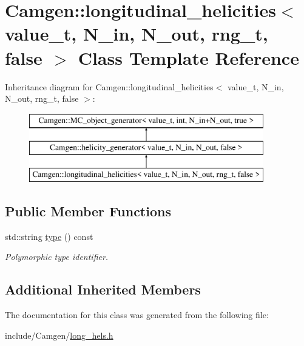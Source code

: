 \hypertarget{a00328}{\section{Camgen\-:\-:longitudinal\-\_\-helicities$<$ value\-\_\-t, N\-\_\-in, N\-\_\-out, rng\-\_\-t, false $>$ Class Template Reference}
\label{a00328}
}
Inheritance diagram for Camgen\-:\-:longitudinal\-\_\-helicities$<$ value\-\_\-t, N\-\_\-in, N\-\_\-out, rng\-\_\-t, false $>$\-:\begin{figure}[H]
\begin{center}
\leavevmode
\includegraphics[height=3.000000cm]{a00328}
\end{center}
\end{figure}
\subsection*{Public Member Functions}
\begin{DoxyCompactItemize}
\item 
\hypertarget{a00328_adf5c08c9ce9c8103ac2f5a088cf5b455}{std\-::string \hyperlink{a00328_adf5c08c9ce9c8103ac2f5a088cf5b455}{type} () const }\label{a00328_adf5c08c9ce9c8103ac2f5a088cf5b455}

\begin{DoxyCompactList}\small\item\em Polymorphic type identifier. \end{DoxyCompactList}\end{DoxyCompactItemize}
\subsection*{Additional Inherited Members}


The documentation for this class was generated from the following file\-:\begin{DoxyCompactItemize}
\item 
include/\-Camgen/\hyperlink{a00662}{long\-\_\-hels.\-h}\end{DoxyCompactItemize}
